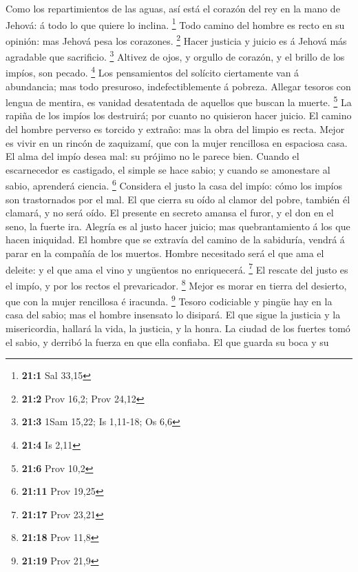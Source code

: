  Como los repartimientos de las aguas, así está el corazón
del rey en la mano de Jehová: á todo lo que quiere lo inclina.
\footnote{\textbf{21:1} Sal 33,15}  Todo camino del hombre
es recto en su opinión: mas Jehová pesa los corazones. \footnote{\textbf{21:2}
  Prov 16,2; Prov 24,12}  Hacer justicia y juicio es á
Jehová más agradable que sacrificio. \footnote{\textbf{21:3} 1Sam 15,22;
  Is 1,11-18; Os 6,6}  Altivez de ojos, y orgullo de
corazón, y el brillo de los impíos, son pecado. \footnote{\textbf{21:4}
  Is 2,11}  Los pensamientos del solícito ciertamente van
á abundancia; mas todo presuroso, indefectiblemente á pobreza.
 Allegar tesoros con lengua de mentira, es vanidad
desatentada de aquellos que buscan la muerte. \footnote{\textbf{21:6}
  Prov 10,2}  La rapiña de los impíos los destruirá; por
cuanto no quisieron hacer juicio.  El camino del hombre
perverso es torcido y extraño: mas la obra del limpio es recta.
 Mejor es vivir en un rincón de zaquizamí, que con la
mujer rencillosa en espaciosa casa.  El alma del impío
desea mal: su prójimo no le parece bien.  Cuando el
escarnecedor es castigado, el simple se hace sabio; y cuando se
amonestare al sabio, aprenderá ciencia. \footnote{\textbf{21:11} Prov
  19,25}  Considera el justo la casa del impío: cómo los
impíos son trastornados por el mal.  El que cierra su
oído al clamor del pobre, también él clamará, y no será oído.
 El presente en secreto amansa el furor, y el don en el
seno, la fuerte ira.  Alegría es al justo hacer juicio;
mas quebrantamiento á los que hacen iniquidad.  El hombre
que se extravía del camino de la sabiduría, vendrá á parar en la
compañía de los muertos.  Hombre necesitado será el que
ama el deleite: y el que ama el vino y ungüentos no enriquecerá.
\footnote{\textbf{21:17} Prov 23,21}  El rescate del
justo es el impío, y por los rectos el prevaricador. \footnote{\textbf{21:18}
  Prov 11,8}  Mejor es morar en tierra del desierto, que
con la mujer rencillosa é iracunda. \footnote{\textbf{21:19} Prov 21,9}
 Tesoro codiciable y pingüe hay en la casa del sabio; mas
el hombre insensato lo disipará.  El que sigue la
justicia y la misericordia, hallará la vida, la justicia, y la honra.
 La ciudad de los fuertes tomó el sabio, y derribó la
fuerza en que ella confiaba.  El que guarda su boca y su
